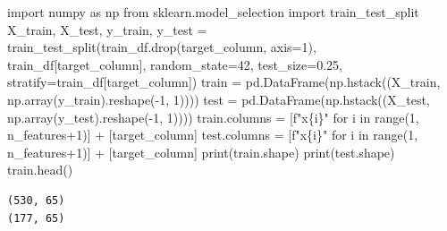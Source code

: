 \documentclass[
  letterpaper,
  DIV=11,
  numbers=noendperiod]{scrreprt}
\newenvironment{Shaded}{\begin{snugshade}}{\end{snugshade}}
\newcommand{\BuiltInTok}[1]{\textcolor[rgb]{0.00,0.23,0.31}{#1}}
\newcommand{\ControlFlowTok}[1]{\textcolor[rgb]{0.00,0.23,0.31}{#1}}
\newcommand{\DecValTok}[1]{\textcolor[rgb]{0.68,0.00,0.00}{#1}}
\newcommand{\FloatTok}[1]{\textcolor[rgb]{0.68,0.00,0.00}{#1}}
\newcommand{\ImportTok}[1]{\textcolor[rgb]{0.00,0.46,0.62}{#1}}
\newcommand{\KeywordTok}[1]{\textcolor[rgb]{0.00,0.23,0.31}{#1}}
\newcommand{\NormalTok}[1]{\textcolor[rgb]{0.00,0.23,0.31}{#1}}
\newcommand{\OperatorTok}[1]{\textcolor[rgb]{0.37,0.37,0.37}{#1}}
\newcommand{\SpecialCharTok}[1]{\textcolor[rgb]{0.37,0.37,0.37}{#1}}
\newcommand{\SpecialStringTok}[1]{\textcolor[rgb]{0.13,0.47,0.30}{#1}}
\begin{document}
\begin{Shaded}
\begin{Highlighting}[]
\ImportTok{import}\NormalTok{ numpy }\ImportTok{as}\NormalTok{ np}
\ImportTok{from}\NormalTok{ sklearn.model\_selection }\ImportTok{import}\NormalTok{ train\_test\_split}
\NormalTok{X\_train, X\_test, y\_train, y\_test }\OperatorTok{=}\NormalTok{ train\_test\_split(train\_df.drop(target\_column, axis}\OperatorTok{=}\DecValTok{1}\NormalTok{), train\_df[target\_column],}
\NormalTok{                                                    random\_state}\OperatorTok{=}\DecValTok{42}\NormalTok{,}
\NormalTok{                                                    test\_size}\OperatorTok{=}\FloatTok{0.25}\NormalTok{,}
\NormalTok{                                                    stratify}\OperatorTok{=}\NormalTok{train\_df[target\_column])}
\NormalTok{train }\OperatorTok{=}\NormalTok{ pd.DataFrame(np.hstack((X\_train, np.array(y\_train).reshape(}\OperatorTok{{-}}\DecValTok{1}\NormalTok{, }\DecValTok{1}\NormalTok{))))}
\NormalTok{test }\OperatorTok{=}\NormalTok{ pd.DataFrame(np.hstack((X\_test, np.array(y\_test).reshape(}\OperatorTok{{-}}\DecValTok{1}\NormalTok{, }\DecValTok{1}\NormalTok{))))}
\NormalTok{train.columns }\OperatorTok{=}\NormalTok{ [}\SpecialStringTok{f"x}\SpecialCharTok{\{}\NormalTok{i}\SpecialCharTok{\}}\SpecialStringTok{"} \ControlFlowTok{for}\NormalTok{ i }\KeywordTok{in} \BuiltInTok{range}\NormalTok{(}\DecValTok{1}\NormalTok{, n\_features}\OperatorTok{+}\DecValTok{1}\NormalTok{)] }\OperatorTok{+}\NormalTok{ [target\_column]}
\NormalTok{test.columns }\OperatorTok{=}\NormalTok{ [}\SpecialStringTok{f"x}\SpecialCharTok{\{}\NormalTok{i}\SpecialCharTok{\}}\SpecialStringTok{"} \ControlFlowTok{for}\NormalTok{ i }\KeywordTok{in} \BuiltInTok{range}\NormalTok{(}\DecValTok{1}\NormalTok{, n\_features}\OperatorTok{+}\DecValTok{1}\NormalTok{)] }\OperatorTok{+}\NormalTok{ [target\_column]}
\BuiltInTok{print}\NormalTok{(train.shape)}
\BuiltInTok{print}\NormalTok{(test.shape)}
\NormalTok{train.head()}
\end{Highlighting}
\end{Shaded}

\begin{verbatim}
(530, 65)
(177, 65)
\end{verbatim}
\end{document}
